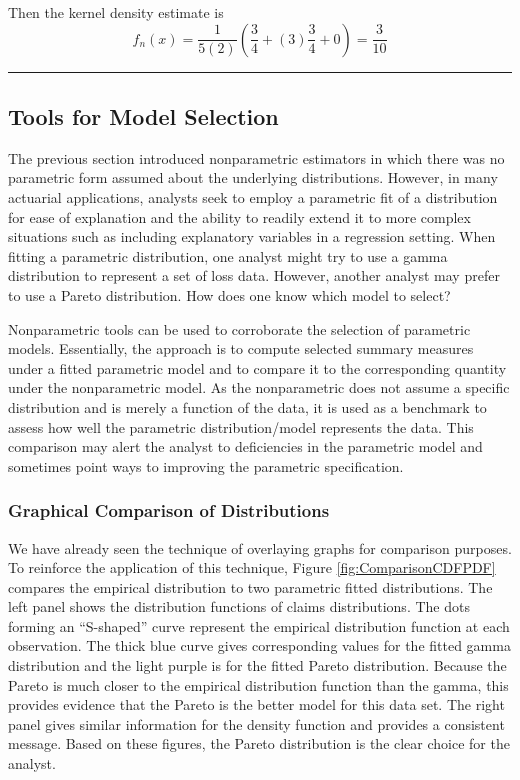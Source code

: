 \documentclass[]{book}
\theoremstyle{definition}
\theoremstyle{definition}
\theoremstyle{definition}
\theoremstyle{remark}
\begin{document}
Then the kernel density estimate is
\[f_n(x) = \frac{1}{5(2)}\left( \frac{3}{4} + (3) \frac{3}{4} + 0 \right) = \frac{3}{10}\]

\begin{center}\rule{0.5\linewidth}{\linethickness}\end{center}

\subsection{Tools for Model Selection}\label{S:ToolsModelSelection}

The previous section introduced nonparametric estimators in which there
was no parametric form assumed about the underlying distributions.
However, in many actuarial applications, analysts seek to employ a
parametric fit of a distribution for ease of explanation and the ability
to readily extend it to more complex situations such as including
explanatory variables in a regression setting. When fitting a parametric
distribution, one analyst might try to use a gamma distribution to
represent a set of loss data. However, another analyst may prefer to use
a Pareto distribution. How does one know which model to select?

Nonparametric tools can be used to corroborate the selection of
parametric models. Essentially, the approach is to compute selected
summary measures under a fitted parametric model and to compare it to
the corresponding quantity under the nonparametric model. As the
nonparametric does not assume a specific distribution and is merely a
function of the data, it is used as a benchmark to assess how well the
parametric distribution/model represents the data. This comparison may
alert the analyst to deficiencies in the parametric model and sometimes
point ways to improving the parametric specification.

\subsubsection{Graphical Comparison of
Distributions}\label{graphical-comparison-of-distributions}

We have already seen the technique of overlaying graphs for comparison
purposes. To reinforce the application of this technique, Figure
\ref{fig:ComparisonCDFPDF} compares the empirical distribution to two
parametric fitted distributions. The left panel shows the distribution
functions of claims distributions. The dots forming an ``S-shaped''
curve represent the empirical distribution function at each observation.
The thick blue curve gives corresponding values for the fitted gamma
distribution and the light purple is for the fitted Pareto distribution.
Because the Pareto is much closer to the empirical distribution function
than the gamma, this provides evidence that the Pareto is the better
model for this data set. The right panel gives similar information for
the density function and provides a consistent message. Based on these
figures, the Pareto distribution is the clear choice for the analyst.
\end{document}

